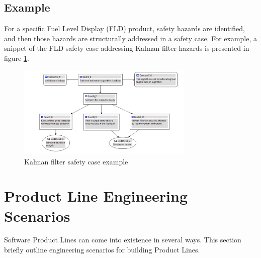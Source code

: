 \documentclass[11pt]{article}
\begin{document}
%
%
%
%
%

\subsection{Example}

For a specific Fuel Level Display (FLD) product, safety hazards are identified, and then those hazards are structurally addressed in a safety case. For example, a snippet of the FLD safety case addressing Kalman filter hazards is presented in figure \ref{fig:SafetyCaseExample}.
 
 \begin{figure}
  \centering
  \includegraphics[width=0.75\textwidth]{SafetyCaseExample}
  \caption{Kalman filter safety case example}
  \label{fig:SafetyCaseExample}
\end{figure}
 
\section{Product Line Engineering Scenarios}

Software Product Lines can come into existence in several ways. This section briefly outline engineering scenarios for building Product Lines.
\end{document}
